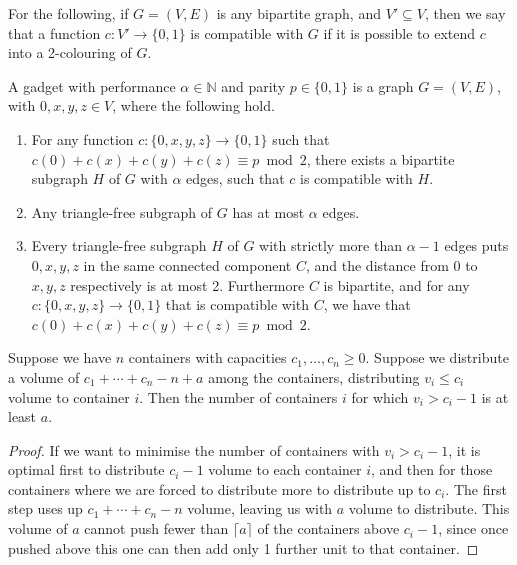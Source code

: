 \documentclass[a4paper,11pt, DIV=11]{scrartcl}
\newcommand{\N}{\ensuremath{\mathbb{N}}}
\theoremstyle{plain}
\theoremstyle{definition}
\begin{document}
For the following, if $G = (V, E)$ is any bipartite graph, and $V' \subseteq V$, then we say that a function $c : V' \to \{ 0, 1 \}$ is compatible with $G$ if it is possible to extend $c$ into a 2-colouring of $G$.

\begin{definition}\label{def:gadget}
    A gadget with performance $\alpha \in \N$ and parity $p \in \{0, 1\}$ is a graph $G = (V, E)$, with $0, x, y, z \in V$, where the following hold.
    \begin{enumerate}
        \item\label{item:soundness} For any function $c : \{ 0, x, y, z \} \to \{0, 1\}$ such that $c(0) + c(x) + c(y) + c(z) \equiv p \bmod 2$, there exists a bipartite subgraph $H$ of $G$ with $\alpha$ edges, such that $c$ is compatible with $H$.
        \item\label{item:completenes1} Any triangle-free subgraph of $G$ has at most $\alpha$ edges.
        \item\label{item:completenes2} Every triangle-free subgraph $H$ of $G$ with strictly more than $\alpha-1$ edges puts $0, x, y, z$ in the same connected component $C$, and the distance from $0$ to $x, y, z$ respectively is at most 2. Furthermore $C$ is bipartite, and for any $c : \{0, x, y, z\} \to \{0, 1\}$ that is compatible with $C$, we have that $c(0) + c(x) + c(y) + c(z) \equiv p \bmod 2$.
    \end{enumerate}
\end{definition}

\begin{lemma}\label{lem:bins}
    Suppose we have $n$ containers with capacities $c_1, \ldots, c_n \geq 0$. Suppose we distribute a volume of $c_1 + \cdots + c_n - n + a$ among the containers, distributing $v_i \leq c_i$ volume to container $i$. Then the number of containers $i$ for which $v_i > c_i - 1$ is at least $a$.
\end{lemma}
\begin{proof}
    If we want to minimise the number of containers with $v_i > c_i - 1$, it is optimal first to distribute $c_i - 1$ volume to each container $i$, and then for those containers where we are forced to distribute more to distribute up to $c_i$. The first step uses up $c_1 + \cdots + c_n - n$ volume, leaving us with $a$ volume to distribute. This volume of $a$ cannot push fewer than $\lceil a\rceil$ of the containers above $c_i - 1$, since once pushed above this one can then add only 1 further unit to that container.
\end{proof}
\end{document}
